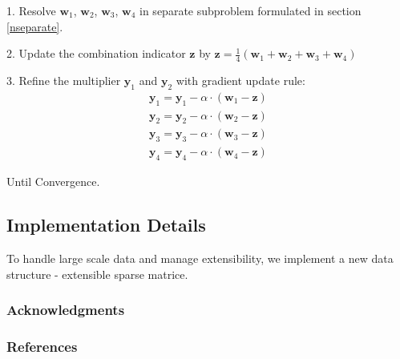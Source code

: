 \documentclass{article} %
\newcommand{\wone}{\mathbf{w}_1}
\newcommand{\wtwo}{\mathbf{w}_2}
\newcommand{\wthree}{\mathbf{w}_3}
\newcommand{\wfour}{\mathbf{w}_4}
\newcommand{\yone}{\mathbf{y}_1}
\newcommand{\ytwo}{\mathbf{y}_2}
\newcommand{\ythree}{\mathbf{y}_3}
\newcommand{\yfour}{\mathbf{y}_4}
\newcommand{\z}{\mathbf{z}}
\begin{document}
1. Resolve $\wone$, $\wtwo$, $\wthree$, $\wfour$ in separate subproblem
formulated in section \ref{nseparate}.

2. Update the combination indicator $\z$ by $\z = \frac{1}{4} (\wone + \wtwo +
\wthree + \wfour)$

3. Refine the multiplier $\yone$ and $\ytwo$ with gradient update rule: 
\begin{align}
\yone = \yone - \alpha \cdot (\wone - \z) \\
\ytwo = \ytwo - \alpha \cdot (\wtwo - \z) \\ 
\ythree = \ythree - \alpha \cdot (\wthree - \z) \\
\yfour = \yfour - \alpha \cdot (\wfour - \z)
\end{align}

Until Convergence.

\subsection{Implementation Details}
To handle large scale data and manage extensibility, we implement a new data
structure - extensible sparse matrice. 

\newpage
\subsubsection*{Acknowledgments}

\subsubsection*{References}
\small{

}
\end{document}

